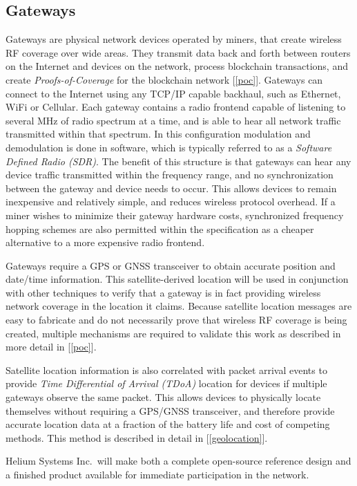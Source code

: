 \documentclass[letterpaper,11pt]{article}
\begin{document}
\subsection{Gateways}\label{gateways}

Gateways are physical network devices operated by miners, that create wireless RF coverage over wide areas. They transmit data back and forth between routers on the Internet and devices on the network, process blockchain transactions, and create \emph{Proofs-of-Coverage} for the blockchain network [\ref{poc}]. Gateways can connect to the Internet using any TCP/IP capable backhaul, such as Ethernet, WiFi or Cellular. Each gateway contains a radio frontend capable of listening to several MHz of radio spectrum at a time, and is able to hear all network traffic transmitted within that spectrum. In this configuration modulation and demodulation is done in software, which is typically referred to as a \emph{Software Defined Radio (SDR)}. The benefit of this structure is that gateways can hear any device traffic transmitted within the frequency range, and no synchronization between the gateway and device needs to occur. This allows devices to remain inexpensive and relatively simple, and reduces wireless protocol overhead. If a miner wishes to minimize their gateway hardware costs, synchronized frequency hopping schemes are also permitted within the specification as a cheaper alternative to a more expensive radio frontend.

Gateways require a GPS or GNSS transceiver to obtain accurate position and date/time information. This satellite-derived location will be used in conjunction with other techniques to verify that a gateway is in fact providing wireless network coverage in the location it claims. Because satellite location messages are easy to fabricate and do not necessarily prove that wireless RF coverage is being created, multiple mechanisms are required to validate this work as described in more detail in [\ref{poc}].

Satellite location information is also correlated with packet arrival events to provide \emph{Time Differential of Arrival (TDoA)} location for devices if multiple gateways observe the same packet. This allows devices to physically locate themselves without requiring a GPS/GNSS transceiver, and therefore provide accurate location data at a fraction of the battery life and cost of competing methods. This method is described in detail in [\ref{geolocation}].

Helium Systems Inc.\ will make both a complete open-source reference design and a finished product available for immediate participation in the network.
\end{document}
